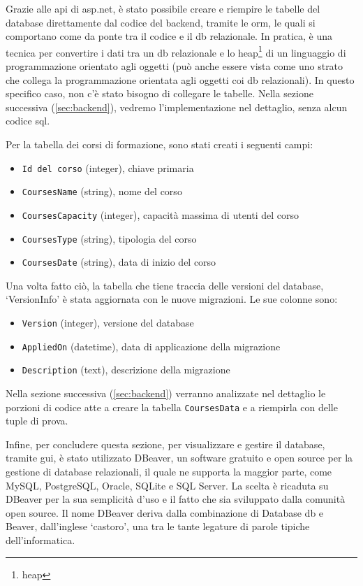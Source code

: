 Grazie alle \acrshort{api} di \acrshort{asp.net}, è stato possibile creare e riempire le tabelle del database direttamente dal codice del backend, tramite le \acrfull{orm}, le quali si comportano come da ponte tra il codice e il \acrshort{db} relazionale. In pratica, è una tecnica per convertire i dati tra un \acrshort{db} relazionale e lo heap\footnote{\glsdesc{heap}} di un linguaggio di programmazione orientato agli oggetti (può anche essere vista come uno strato che collega la programmazione orientata agli oggetti coi \acrshort{db} relazionali). In questo specifico caso, non c'è stato bisogno di collegare le tabelle.
Nella sezione successiva (\ref{sec:backend}), vedremo l'implementazione nel dettaglio, senza alcun codice \acrshort{sql}.

Per la tabella dei corsi di formazione, sono stati creati i seguenti campi: 
\begin{itemize}
  \item \texttt{Id del corso} (integer), chiave primaria
  \item \texttt{CoursesName} (string), nome del corso
  \item \texttt{CoursesCapacity} (integer), capacità massima di utenti del corso
  \item \texttt{CoursesType} (string), tipologia del corso
  \item \texttt{CoursesDate} (string), data di inizio del corso
\end{itemize}

Una volta fatto ciò, la tabella che tiene traccia delle versioni del database, `VersionInfo' è stata aggiornata con le nuove migrazioni. Le sue colonne sono:
\begin{itemize}
  \item \texttt{Version} (integer), versione del database
  \item \texttt{AppliedOn} (datetime), data di applicazione della migrazione
  \item \texttt{Description} (text), descrizione della migrazione
\end{itemize}

Nella sezione successiva (\ref{sec:backend}) verranno analizzate nel dettaglio le porzioni di codice atte a creare la tabella \texttt{CoursesData} e a riempirla con delle tuple di prova.

Infine, per concludere questa sezione, per visualizzare e gestire il database, tramite \acrshort{gui}, è stato utilizzato DBeaver, un software gratuito e open source per la gestione di database relazionali, il quale ne supporta la maggior parte, come MySQL, PostgreSQL, Oracle, SQLite e SQL Server. La scelta è ricaduta su DBeaver per la sua semplicità d'uso e il fatto che sia sviluppato dalla comunità open source.
Il nome DBeaver deriva dalla combinazione di Database \acrshort{db} e Beaver, dall'inglese `castoro', una tra le tante legature di parole tipiche dell'informatica.

